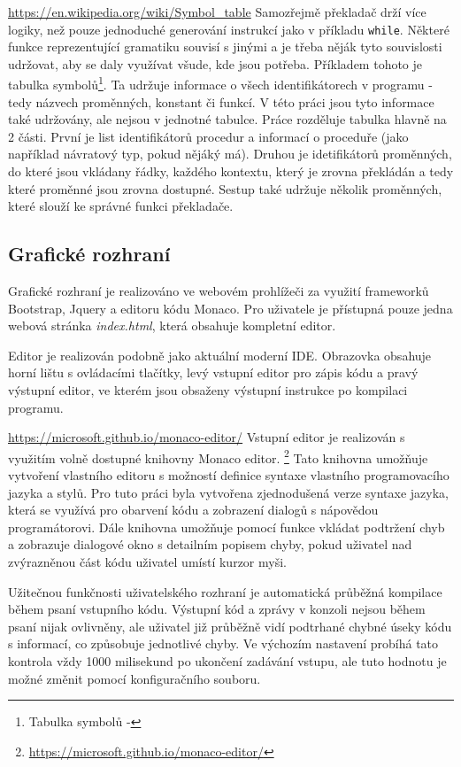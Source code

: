 \documentclass[12pt, letterpaper]{article}
\begin{document}
%
\urldef{\urlC}\url{https://en.wikipedia.org/wiki/Symbol_table}
Samozřejmě překladač drží více logiky, než pouze jednoduché generování instrukcí jako v příkladu \texttt{while}. Některé
funkce reprezentující gramatiku souvisí s jinými a je třeba něják tyto souvislosti udržovat, aby se daly využívat všude,
kde jsou potřeba. Příkladem tohoto je tabulka symbolů\footnote{Tabulka symbolů - \urlC}. Ta udržuje informace o všech identifikátorech v
programu - tedy názvech proměnných, konstant či funkcí. V této práci jsou tyto informace také udržovány, ale nejsou v
jednotné tabulce. Práce rozděluje tabulka hlavně na 2 části. První je list identifikátorů procedur a informací o 
proceduře (jako například návratový typ, pokud nějáký má). Druhou je  idetifikátorů proměnných, do které jsou
vkládany řádky, každého kontextu, který je zrovna překládán a tedy které proměnné jsou zrovna dostupné. Sestup také 
udržuje několik  proměnných, které slouží ke správné funkci překladače.
%
\subsection{Grafické rozhraní}
Grafické rozhraní je realizováno ve webovém prohlížeči za využití frameworků Bootstrap, Jquery a editoru kódu Monaco. Pro uživatele je přístupná pouze jedna webová stránka \textit{index.html}, která obsahuje kompletní editor. 

Editor je realizován podobně jako aktuální moderní IDE. Obrazovka obsahuje horní lištu s ovládacími tlačítky, levý vstupní editor pro zápis kódu a pravý výstupní editor, ve kterém jsou obsaženy výstupní instrukce po kompilaci programu.

\urldef{\urlD}\url{https://microsoft.github.io/monaco-editor/}
Vstupní editor je realizován s využitím volně dostupné knihovny Monaco editor. \footnote{\url{https://microsoft.github.io/monaco-editor/}} Tato knihovna umožňuje vytvoření vlastního editoru s možností definice syntaxe vlastního programovacího jazyka a stylů. Pro tuto práci byla vytvořena zjednodušená verze syntaxe jazyka, která se využívá pro obarvení kódu a zobrazení dialogů s nápovědou programátorovi. Dále knihovna umožňuje pomocí funkce vkládat podtržení chyb a zobrazuje dialogové okno s detailním popisem chyby, pokud uživatel nad zvýrazněnou část kódu uživatel umístí kurzor myši.


Užitečnou funkčnosti uživatelského rozhraní je automatická průběžná kompilace během psaní vstupního kódu. Výstupní kód a zprávy v konzoli nejsou během psaní nijak ovlivněny, ale uživatel již průběžně vidí podtrhané chybné úseky kódu s informací, co způsobuje jednotlivé chyby. Ve výchozím nastavení probíhá tato kontrola vždy 1000 milisekund po ukončení zadávání vstupu, ale tuto hodnotu je možné změnit pomocí konfiguračního souboru.
\end{document}
